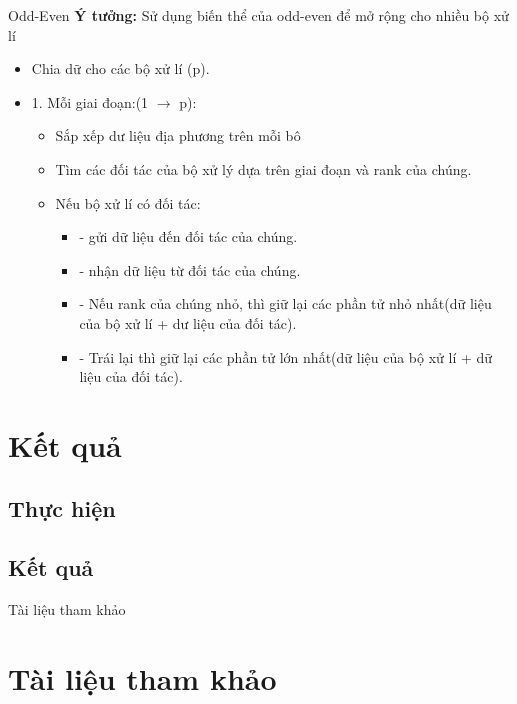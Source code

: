 \documentclass{beamer}
\newcommand{\bi}{\begin{itemize}}
\newcommand{\ei}{\end{itemize}}
\begin{document}
\begin{frame}{Odd-Even}
\textbf{Ý tưởng:} Sử dụng biến thể của odd-even để mở rộng cho nhiều bộ xử lí
\bi
\item Chia dữ cho các bộ xử lí (p).
\item[1.] Mỗi giai đoạn:(1 $\longrightarrow$ p):
\bi
\item Sắp xếp dư liệu địa phương trên mỗi bô
\item Tìm các đối tác của bộ xử lý dựa trên giai đoạn và rank của chúng.
\item Nếu bộ xử lí có đối tác:
\bi
\item[- ] gửi dữ liệu đến đối tác của chúng.
\item[- ] nhận dữ liệu từ đối tác của chúng.
\item[- ] Nếu rank của chúng nhỏ, thì giữ lại các phần tử nhỏ nhất(dữ liệu của bộ xử lí + dư liệu của đối tác).
\item[- ] Trái lại thì giữ lại các phần tử lớn nhất(dữ liệu của bộ xử lí + dữ liệu của đối tác).
\ei
\ei
\ei
\end{frame}
\section{Kết quả}
\subsection{Thực hiện}
\subsection{Kết quả}
\begin{frame}{Tài liệu tham khảo}
\section*{Tài liệu tham khảo}

\end{frame}
\end{document}
